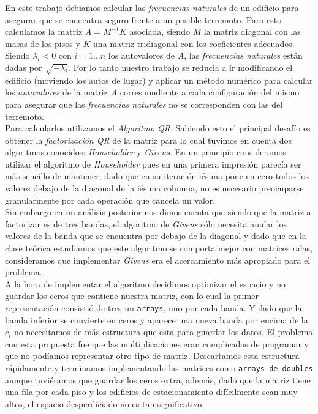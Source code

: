 \documentclass[a4paper]{article}
\begin{document}
En este trabajo debiamos calcular las \textit{frecuencias naturales} de un edificio para asegurar que se encuentra seguro frente a un posible terremoto. Para esto calculamos la matriz $A = M^{-1}K$ asociada, siendo $M$ la matriz diagonal con las masas de los pisos y $K$ una matriz tridiagonal con los coeficientes adecuados. Siendo $\lambda_i < 0$ con $i = 1 \hdots n$ los autovalores de $A$, las \textit{frecuencias naturales} están dadas por $\sqrt{-\lambda_i}$. Por lo tanto nuestro trabajo se reducia a ir modificando el edificio (moviendo los autos de lugar) y aplicar un método numérico para calcular los \textit{autovalores} de la matriz $A$ correspondiente a cada configuración del mismo para asegurar que las \textit{frecuencias naturales} no se corresponden con las del terremoto.\\


Para calcularlos utilizamos el \textit{Algoritmo QR}. Sabiendo esto el principal desafío es obtener la \textit{factorización QR} de la matriz para lo cual tuvimos en cuenta dos algoritmos conocidos: \textit{Householder} y \textit{Givens}.
En un principio consideramos utilizar el algoritmo de \textit{Householder} pues en una primera impresión parecía ser más sencillo de mantener, dado que en su iteración iésima pone en cero todos los valores debajo de la diagonal de la iésima columna, no es necesario preocuparse granularmente por cada operación que cancela un valor.\\
Sin embargo en un análisis posterior nos dimos cuenta que siendo que la matriz a factorizar es de tres bandas, el algoritmo de \textit{Givens} sólo necesita anular los valores de la banda que se encuentra por debajo de la diagonal y dado que en la clase teórica estudiamos que este algoritmo se comporta mejor con matrices ralas, consideramos que implementar \textit{Givens} era el acercamiento más apropiado para el problema.\\

A la hora de implementar el algoritmo decidimos optimizar el espacio y no guardar los ceros que contiene nuestra matriz, con lo cual la primer representación consistió de tres un \texttt{arrays}, uno por cada banda. Y dado que la banda inferior se convierte en ceros y aparece una nueva banda por encima de la $c_i$ no necesitamos de más estructura que esta para guardar los datos. El problema con esta propuesta fue que las multiplicaciones eran complicadas de programar y que no podíamos representar otro tipo de matriz. Descartamos esta estructura rápidamente y terminamos implementando las matrices como \texttt{arrays de doubles} aunque tuviéramos que guardar los ceros extra, además, dado que la matriz tiene una fila por cada piso y los edificios de estacionamiento difícilmente sean muy altos, el espacio desperdiciado no es tan significativo.
\end{document}
